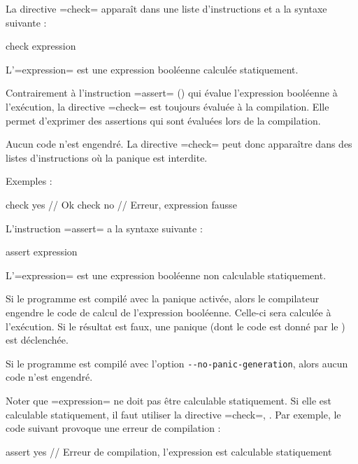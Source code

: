 
La directive \plm=check= apparaît dans une liste d'instructions et a la syntaxe suivante :
\begin{PLM}
check expression
\end{PLM}

L'\plm=expression= est une expression booléenne calculée statiquement.

Contrairement à l'instruction \plm=assert= () qui évalue l'expression booléenne à l'exécution, la directive \plm=check= est toujours évaluée à la compilation. Elle permet d'exprimer des assertions qui sont évaluées lors de la compilation.

Aucun code n'est engendré. La directive \plm=check= peut donc apparaître dans des listes d'instructions où la panique est interdite.

Exemples :
\begin{PLM}
check yes  // Ok
check no // Erreur, expression fausse
\end{PLM}




L'instruction \plm=assert= a la syntaxe suivante :
\begin{PLM}
assert expression
\end{PLM}

L'\plm=expression= est une expression booléenne non calculable statiquement.

Si le programme est compilé avec la panique activée, alors le compilateur engendre le code de calcul de l'expression booléenne. Celle-ci sera calculée à l'exécution. Si le résultat est faux, une panique (dont le code est donné par le ) est déclenchée.

Si le programme est compilé avec l'option \texttt{-{}-no-panic-generation}, alors aucun code n'est engendré.

Noter que \plm=expression= ne doit pas être calculable statiquement. Si elle est calculable statiquement, il faut utiliser la directive \plm=check=, . Par exemple, le code suivant provoque une erreur de compilation :
\begin{PLM}
assert yes // Erreur de compilation, l'expression est calculable statiquement
\end{PLM}







